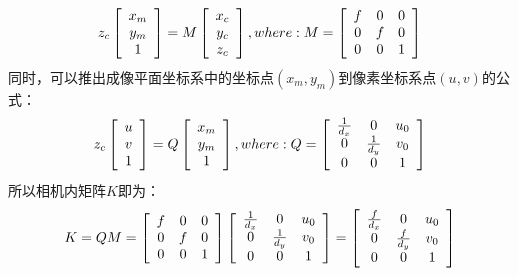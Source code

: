 \documentclass[UTF8]{ctexart}
\begin{document}
\begin{align}
 z_c \left[ \begin{array}{c}  x_m \\ y_m \\ 1 \end{array} \right] =
 M \left[ \begin{array}{c}   x_c \\  y_c \\  z_c  \end{array}\right], where:
 M = \left [ \begin{array}{ c c c}
f & 0   & 0 \\
0  & f & 0 \\
0  & 0   & 1 \\
\end{array} \right ]
\end{align}
同时，可以推出成像平面坐标系中的坐标点$(x_m,y_m)$到像素坐标系点$(u,v)$的公式：
\begin{align}
z_c \left[ \begin{array}{c}  u \\ v \\ 1 \end{array} \right] =
 Q \left[ \begin{array}{c}   x_m \\  y_m \\  1  \end{array}\right], where:
Q = \left [ \begin{array}{ c c c}
\frac{1}{d_x} & 0   & u_0 \\
0  & \frac{1}{d_y} & v_0 \\
0  & 0   & 1 \\
\end{array} \right ]
\end{align}
所以相机内矩阵$K$即为：
\begin{align}
K = QM=
\left [ \begin{array}{ c c c}
f & 0   & 0 \\
0  & f & 0 \\
0  & 0   & 1 \\
\end{array} \right ]
\left [ \begin{array}{ c c c}
\frac{1}{d_x} & 0   & u_0 \\
0  & \frac{1}{d_y} & v_0 \\
0  & 0   & 1 \\
\end{array} \right ]
=
\left [ \begin{array}{ c c c}
\frac{f}{d_x} & 0   & u_0 \\
0  & \frac{f}{d_y} & v_0 \\
0  & 0   & 1 \\
\end{array} \right ]
\end{align}
\end{document}
